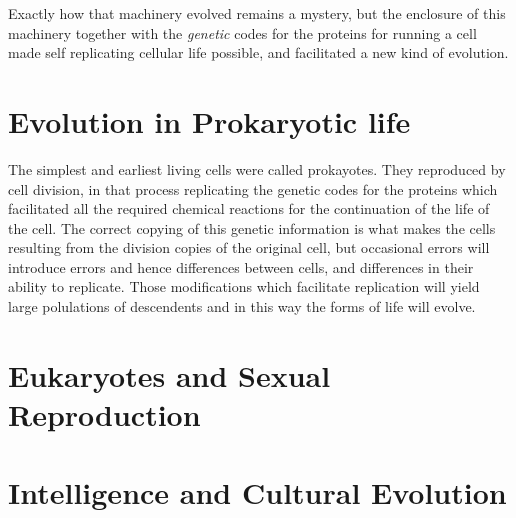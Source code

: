 Exactly how that machinery evolved remains a mystery, but the enclosure of this machinery together with the \emph{genetic} codes for the proteins for running a cell made self replicating cellular life possible, and facilitated a new kind of evolution.

\section{Evolution in Prokaryotic life}

The simplest and earliest living cells were called prokayotes.
They reproduced by cell division, in that process replicating the genetic codes for the proteins which facilitated all the required chemical reactions for the continuation of the life of the cell.
The correct copying of this genetic information is what makes the cells resulting from the division copies of the original cell, but occasional errors will introduce errors and hence differences between cells, and differences in their ability to replicate.
Those modifications which facilitate replication will yield large polulations of descendents and in this way the forms of life will evolve.

\section{Eukaryotes and Sexual Reproduction}


\section{Intelligence and Cultural Evolution}
